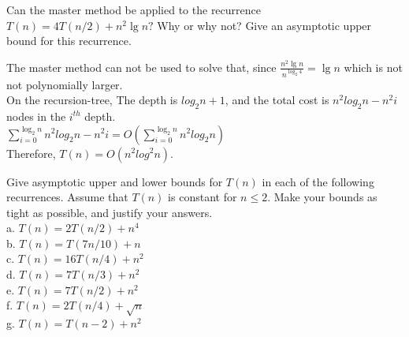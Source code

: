 \documentclass[a4paper, justified]{tufte-handout}
\begin{document}
\begin{problem}[TC 4.5-4]
Can the master method be applied to the recurrence $T(n)=4 T(n / 2)+n^{2} \lg n ?$ Why or why not? Give an asymptotic upper bound for this recurrence.
\end{problem}

\begin{solution}
The master method can not be used to solve that, since $\frac{n^2\lg n}{n^{\log_2{4}}}=\lg n$ which is not not polynomially larger.\\
On the  recursion-tree, The depth is  $log_2{n}+1$, and the total cost is  $n^2log_2n-n^2i$ nodes in the $i^{th}$ depth.\\  
$\sum\limits_{i=0}^{\log_2n}n^2log_2n-n^2i=O(\sum\limits_{i=0}^{\log_2n}n^2log_2n)$\\
Therefore, $T(n)=O(n^2log^2n)$.
\end{solution}

\begin{problem}[TC Problem 4-1]
Give asymptotic upper and lower bounds for $T(n)$ in each of the following recurrences. Assume that $T(n)$ is constant for $n \leq 2 .$ Make your bounds as tight as possible, and justify your answers.\\
a. $T(n)=2 T(n / 2)+n^{4}$\\
b. $T(n)=T(7 n / 10)+n$\\
c. $T(n)=16 T(n / 4)+n^{2}$\\
d. $T(n)=7 T(n / 3)+n^{2}$\\
e. $T(n)=7 T(n / 2)+n^{2}$\\
f.  $T(n)=2 T(n / 4)+\sqrt{n}$\\
g. $T(n)=T(n-2)+n^{2}$

\end{problem}
\end{document}
